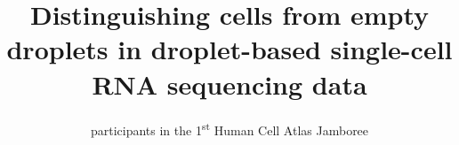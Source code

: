 \documentclass{bmcart}
\begin{document}
\begin{frontmatter}

\begin{fmbox}


\title{Distinguishing cells from empty droplets in droplet-based single-cell RNA sequencing data}


\author[
    addressref={cruk},
    corref={cruk},
    noteref={n1},
    email={aaron.lun@cruk.cam.ac.uk}
]{ }
\author[
	addressref={broad},
    noteref={n1}
]{ }
\author[
	addressref={sanger},
    noteref={n1}
]{ }
\author[
    addressref={sloan},
    noteref={n1}
]{ }
\author[
    addressref={sanger},
    noteref={n1}
]{ }
\author[
    noteref={n2}
]{participants in the 1\textsuperscript{st} Human Cell Atlas Jamboree}
\author[
    addressref={cruk,sanger,ebi},
    corref={ebi},
    email={marioni@ebi.ac.uk}
]{ }



\end{fmbox}
\end{frontmatter}
\end{document}
